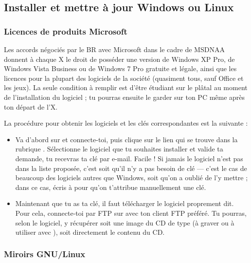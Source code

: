 \subsection{Installer et mettre à jour Windows ou Linux}

\subsubsection{Licences de produits Microsoft}
\label{msdnaa} Les accords n\'egoci\'es par le BR avec Microsoft dans le cadre de MSDNAA donnent \`a  chaque X le droit de poss\'eder une version de Windows
XP Pro, de Windows Vista Business ou de Windows 7 Pro gratuite et l\'egale, ainsi que les licences pour la plupart des logiciels de la soci\'et\'e (quasiment tous, sauf
Office et les jeux). La seule condition \`a  remplir est d'\^etre \'etudiant sur le pl\^atal au moment de l'installation du logiciel ; tu pourras ensuite le
garder sur ton PC m\^eme apr\`es ton d\'epart de l'X.

La proc\'edure pour obtenir les logiciels et les cl\'es correspondantes
est la suivante :
\begin{itemize}

\item Va d'abord sur \fkz et connecte-toi, puis clique sur le lien  qui se trouve dans la rubrique . S\'electionne le logiciel que tu souhaites installer et valide ta demande, tu recevras ta cl\'e par e-mail. Facile ! Si jamais le logiciel n'est pas dans la liste propos\'ee, c'est soit qu'il n'y a pas besoin de cl\'e --- c'est le cas de beaucoup des logiciels autres que Windows, soit qu'on a oubli\'e de l'y mettre ; dans ce cas, \'ecris \`a   pour qu'on t'attribue manuellement une cl\'e.

\item Maintenant que tu as ta cl\'e, il faut t\'el\'echarger le logiciel proprement
dit. Pour cela, connecte-toi par FTP sur  avec ton client FTP pr\'ef\'er\'e. Tu pourras, selon le logiciel, y r\'ecup\'erer soit une image du CD de type  (\`a 
graver ou \`a  utiliser avec ), soit directement le contenu du CD.
 
\end{itemize}

\subsubsection{Miroirs GNU/Linux}


